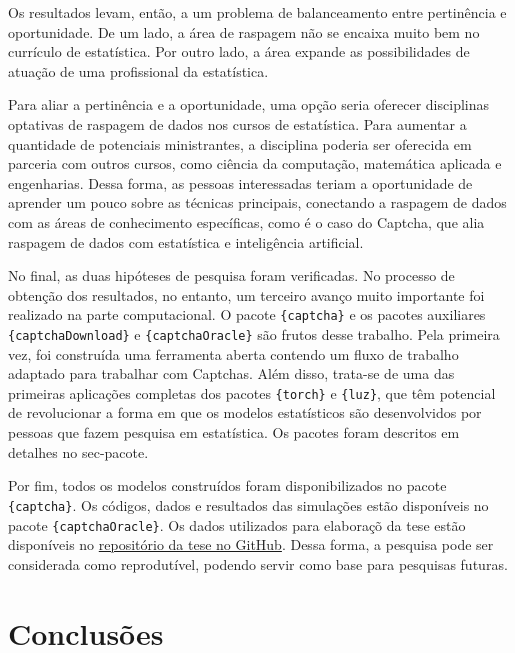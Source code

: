 \documentclass[12pt,twoside,brazilian]{book}
\begin{document}
Os resultados levam, então, a um problema de balanceamento entre
pertinência e oportunidade. De um lado, a área de raspagem não se
encaixa muito bem no currículo de estatística. Por outro lado, a área
expande as possibilidades de atuação de uma profissional da estatística.

Para aliar a pertinência e a oportunidade, uma opção seria oferecer
disciplinas optativas de raspagem de dados nos cursos de estatística.
Para aumentar a quantidade de potenciais ministrantes, a disciplina
poderia ser oferecida em parceria com outros cursos, como ciência da
computação, matemática aplicada e engenharias. Dessa forma, as pessoas
interessadas teriam a oportunidade de aprender um pouco sobre as
técnicas principais, conectando a raspagem de dados com as áreas de
conhecimento específicas, como é o caso do Captcha, que alia raspagem de
dados com estatística e inteligência artificial.

No final, as duas hipóteses de pesquisa foram verificadas. No processo
de obtenção dos resultados, no entanto, um terceiro avanço muito
importante foi realizado na parte computacional. O pacote
\texttt{\{captcha\}} e os pacotes auxiliares
\texttt{\{captchaDownload\}} e \texttt{\{captchaOracle\}} são frutos
desse trabalho. Pela primeira vez, foi construída uma ferramenta aberta
contendo um fluxo de trabalho adaptado para trabalhar com Captchas. Além
disso, trata-se de uma das primeiras aplicações completas dos pacotes
\texttt{\{torch\}} e \texttt{\{luz\}}, que têm potencial de revolucionar
a forma em que os modelos estatísticos são desenvolvidos por pessoas que
fazem pesquisa em estatística. Os pacotes foram descritos em detalhes no
sec-pacote.

Por fim, todos os modelos construídos foram disponibilizados no pacote
\texttt{\{captcha\}}. Os códigos, dados e resultados das simulações
estão disponíveis no pacote \texttt{\{captchaOracle\}}. Os dados
utilizados para elaboraçõ da tese estão disponíveis no
\href{https://github.com/jtrecenti/doutorado}{repositório da tese no
GitHub}. Dessa forma, a pesquisa pode ser considerada como reprodutível,
podendo servir como base para pesquisas futuras.


\hypertarget{conclusao}{%
\chapter{Conclusões}\label{conclusao}}

\end{document}
